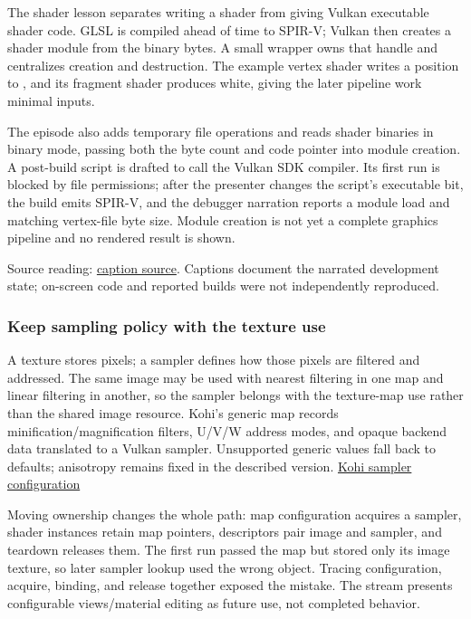 \hypertarget{06-engine-ii-ch025-shader-modules-as-pipeline-inputs}{}

The shader lesson separates writing a shader from giving Vulkan executable shader code. GLSL is compiled ahead of time to SPIR-V; Vulkan then creates a shader module from the binary bytes. A small wrapper owns that handle and centralizes creation and destruction. The example vertex shader writes a position to , and its fragment shader produces white, giving the later pipeline work minimal inputs.

The episode also adds temporary file operations and reads shader binaries in binary mode, passing both the byte count and code pointer into module creation. A post-build script is drafted to call the Vulkan SDK compiler. Its first run is blocked by file permissions; after the presenter changes the script's executable bit, the build emits SPIR-V, and the debugger narration reports a module load and matching vertex-file byte size. Module creation is not yet a complete graphics pipeline and no rendered result is shown.

Source reading: \href{https://www.youtube.com/watch?v=01KQiQ4fdXs}{caption source}. Captions document the narrated development state; on-screen code and reported builds were not independently reproduced.

\subsubsection{Keep sampling policy with the texture use}\label{06-engine-ii-ch025-keep-sampling-policy-with-the-texture-use}

\hypertarget{06-engine-ii-ch025-keep-sampling-policy-with-the-texture-use}{}

A texture stores pixels; a sampler defines how those pixels are filtered and addressed. The same image may be used with nearest filtering in one map and linear filtering in another, so the sampler belongs with the texture-map use rather than the shared image resource. Kohi's generic map records minification/magnification filters, U/V/W address modes, and opaque backend data translated to a Vulkan sampler. Unsupported generic values fall back to defaults; anisotropy remains fixed in the described version. \href{https://www.youtube.com/watch?v=hGA2veSznn8}{Kohi sampler configuration}

Moving ownership changes the whole path: map configuration acquires a sampler, shader instances retain map pointers, descriptors pair image and sampler, and teardown releases them. The first run passed the map but stored only its image texture, so later sampler lookup used the wrong object. Tracing configuration, acquire, binding, and release together exposed the mistake. The stream presents configurable views/material editing as future use, not completed behavior.

